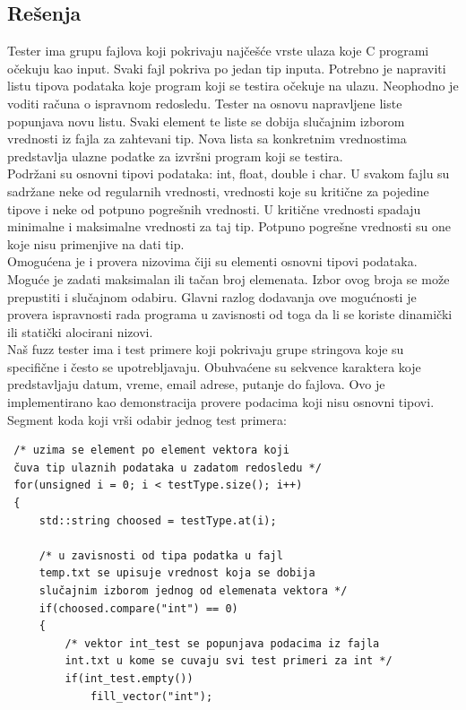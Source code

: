 \documentclass[a4paper]{article}
\begin{document}
{\subsection{Rešenja}
\label{subsec:resenja_koje_nudi_tester}

Tester ima grupu fajlova koji pokrivaju najčešće vrste ulaza koje C programi očekuju kao input. Svaki fajl pokriva po jedan tip inputa. Potrebno je napraviti listu tipova podataka koje program koji se testira očekuje na ulazu. Neophodno je voditi računa o ispravnom redosledu. Tester na osnovu napravljene liste popunjava novu listu. Svaki element te liste se dobija slučajnim izborom vrednosti iz fajla za zahtevani tip. Nova lista sa konkretnim vrednostima predstavlja ulazne podatke za izvršni program koji se testira. \\

Podržani su osnovni tipovi podataka: int, float, double i char. U svakom fajlu su sadržane neke od regularnih vrednosti, vrednosti koje su kritične za pojedine tipove i neke od potpuno pogrešnih vrednosti. U kritične vrednosti spadaju minimalne i maksimalne vrednosti za taj tip. Potpuno pogrešne vrednosti su one koje nisu primenjive na dati tip. \\

Omogućena je i provera nizovima čiji su elementi osnovni tipovi podataka. Moguće je zadati maksimalan ili tačan broj elemenata. Izbor ovog broja se može prepustiti i slučajnom odabiru. Glavni razlog dodavanja ove mogućnosti je provera ispravnosti rada programa u zavisnosti od toga da li se koriste dinamički ili statički alocirani nizovi. \\

Naš fuzz tester ima i test primere koji pokrivaju grupe stringova koje su specifične i često se upotrebljavaju. Obuhvaćene su sekvence karaktera koje predstavljaju datum, vreme, email adrese, putanje do fajlova. Ovo je implementirano kao demonstracija provere podacima koji nisu osnovni tipovi. \\
 
Segment koda koji vrši odabir jednog test primera:
\begin{verbatim}
 /* uzima se element po element vektora koji 
 čuva tip ulaznih podataka u zadatom redosledu */
 for(unsigned i = 0; i < testType.size(); i++)
 {
     std::string choosed = testType.at(i);
     
     /* u zavisnosti od tipa podatka u fajl 
     temp.txt se upisuje vrednost koja se dobija 
     slučajnim izborom jednog od elemenata vektora */
     if(choosed.compare("int") == 0)
     {
         /* vektor int_test se popunjava podacima iz fajla
         int.txt u kome se cuvaju svi test primeri za int */
         if(int_test.empty())
             fill_vector("int"); 
                  

\end{verbatim}}
\end{document}
